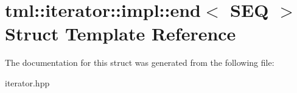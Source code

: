 \hypertarget{structtml_1_1iterator_1_1impl_1_1end}{\section{tml\+:\+:iterator\+:\+:impl\+:\+:end$<$ S\+E\+Q $>$ Struct Template Reference}
\label{structtml_1_1iterator_1_1impl_1_1end}
}


The documentation for this struct was generated from the following file\+:\begin{DoxyCompactItemize}
\item 
iterator.\+hpp\end{DoxyCompactItemize}
